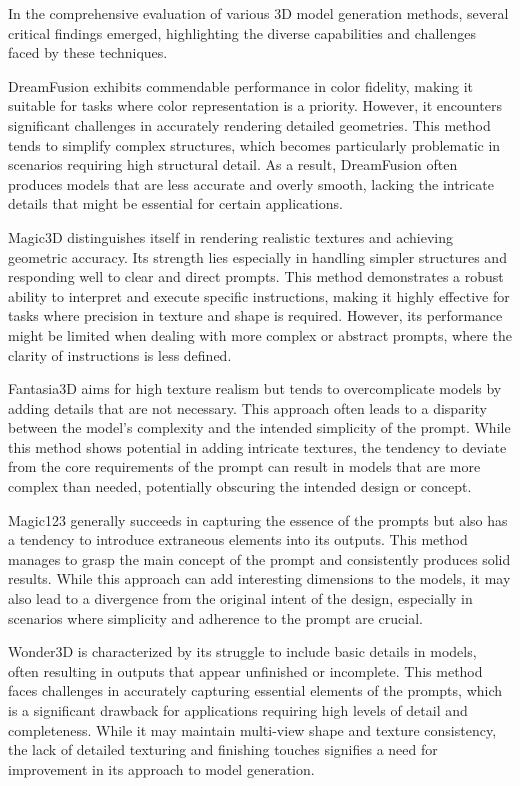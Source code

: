 In the comprehensive evaluation of various 3D model generation methods, several critical findings emerged, highlighting the diverse capabilities and challenges faced by these techniques. 

DreamFusion exhibits commendable performance in color fidelity, making it suitable for tasks where color representation is a priority. However, it encounters significant challenges in accurately rendering detailed geometries. This method tends to simplify complex structures, which becomes particularly problematic in scenarios requiring high structural detail. As a result, DreamFusion often produces models that are less accurate and overly smooth, lacking the intricate details that might be essential for certain applications.

Magic3D distinguishes itself in rendering realistic textures and achieving geometric accuracy. Its strength lies especially in handling simpler structures and responding well to clear and direct prompts. This method demonstrates a robust ability to interpret and execute specific instructions, making it highly effective for tasks where precision in texture and shape is required. However, its performance might be limited when dealing with more complex or abstract prompts, where the clarity of instructions is less defined.

Fantasia3D aims for high texture realism but tends to overcomplicate models by adding details that are not necessary. This approach often leads to a disparity between the model's complexity and the intended simplicity of the prompt. While this method shows potential in adding intricate textures, the tendency to deviate from the core requirements of the prompt can result in models that are more complex than needed, potentially obscuring the intended design or concept.

Magic123 generally succeeds in capturing the essence of the prompts but also has a tendency to introduce extraneous elements into its outputs. This method manages to grasp the main concept of the prompt and consistently produces solid results. While this approach can add interesting dimensions to the models, it may also lead to a divergence from the original intent of the design, especially in scenarios where simplicity and adherence to the prompt are crucial.

Wonder3D is characterized by its struggle to include basic details in models, often resulting in outputs that appear unfinished or incomplete. This method faces challenges in accurately capturing essential elements of the prompts, which is a significant drawback for applications requiring high levels of detail and completeness. While it may maintain multi-view shape and texture consistency, the lack of detailed texturing and finishing touches signifies a need for improvement in its approach to model generation.

